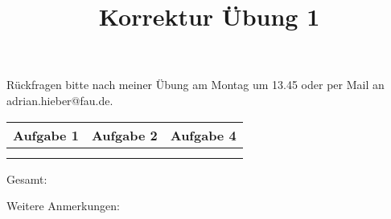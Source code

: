 \documentclass[11pt,a4paper]{article}
\title{Korrektur Übung 1}
\date{}
\begin{document}
\maketitle

\begin{center}
    Rückfragen bitte nach meiner Übung am Montag um 13.45 oder per Mail an adrian.hieber@fau.de.
\end{center}

\vspace{2cm}

\begin{center}
    \begin{tabular}[h]{l|c|r}
    Aufgabe 1 & Aufgabe 2 & Aufgabe 4 \\
    \hline
      &   &   \\
      & & \\
    \end{tabular}
    \qquad Gesamt: 
\end{center}

\vspace{2cm}

Weitere Anmerkungen:
\end{document}
